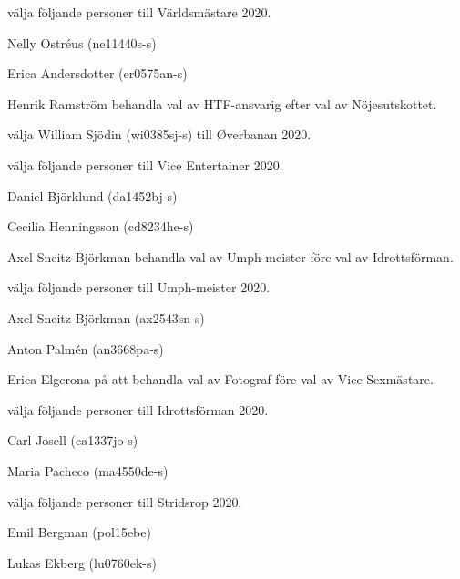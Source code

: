 \documentclass[10pt]{article}
\begin{document}
\begin{paragrafer}
\begin{paralist}
    \Mba välja följande personer till Världsmästare 2020.
    \begin{tightdashlist}
        \item Nelly Ostréus (ne11440s-s)
        \item Erica Andersdotter (er0575an-s)
    \end{tightdashlist}

    Henrik Ramström \ypa behandla val av HTF-ansvarig efter val av Nöjesutskottet.

    \textbf{\Mbaby}

    \Mba välja William Sjödin (wi0385sj-s) till Øverbanan 2020. 

    \Mba välja följande personer till Vice Entertainer 2020.
    \begin{tightdashlist}
        \item Daniel Björklund (da1452bj-s)
        \item Cecilia Henningsson (cd8234he-s)
    \end{tightdashlist}

    Axel Sneitz-Björkman \ypa behandla val av Umph-meister före val av Idrottsförman.

    \textbf{\Mbaby}

    \Mba välja följande personer till Umph-meister 2020.
    \begin{tightdashlist}
        \item Axel Sneitz-Björkman (ax2543sn-s)
        \item Anton Palmén (an3668pa-s)
    \end{tightdashlist}
    
    Erica Elgcrona \ypa på att behandla val av Fotograf före val av Vice Sexmästare.

    \textbf{\Mbaby}

    \Mba välja följande personer till Idrottsförman 2020.
    \begin{tightdashlist}
        \item Carl Josell (ca1337jo-s)
        \item Maria Pacheco (ma4550de-s)
    \end{tightdashlist}

    \Mba välja följande personer till Stridsrop 2020.
    \begin{tightdashlist}
        \item Emil Bergman (pol15ebe)
        \item Lukas Ekberg (lu0760ek-s)
    \end{tightdashlist}


\end{paralist}
\end{paragrafer}
\end{document}

